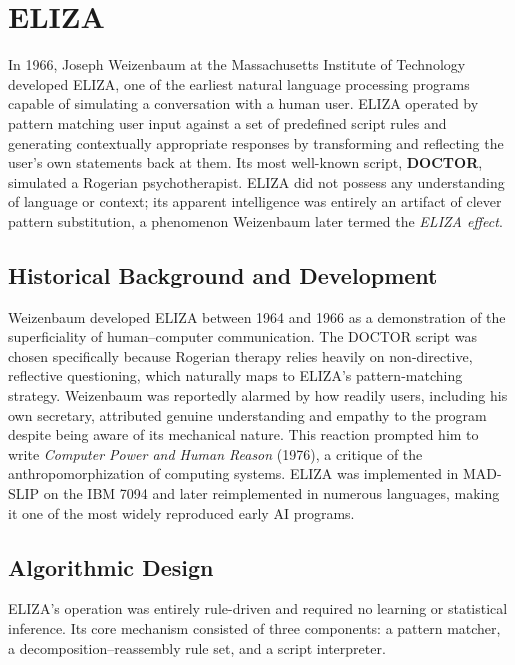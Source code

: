 \documentclass[11pt,a4paper]{report}
\begin{document}

\section{ELIZA}
In 1966, Joseph Weizenbaum at the Massachusetts Institute of Technology developed ELIZA, one of the earliest
natural language processing programs capable of simulating a conversation with a human user. ELIZA operated by
pattern matching user input against a set of predefined script rules and generating contextually appropriate
responses by transforming and reflecting the user's own statements back at them. Its most well-known script,
\textbf{DOCTOR}, simulated a Rogerian psychotherapist. ELIZA did not possess any understanding of language or
context; its apparent intelligence was entirely an artifact of clever pattern substitution, a phenomenon
Weizenbaum later termed the \textit{ELIZA effect}.

\subsection{Historical Background and Development}
Weizenbaum developed ELIZA between 1964 and 1966 as a demonstration of the superficiality of human--computer
communication. The DOCTOR script was chosen specifically because Rogerian therapy relies heavily on non-directive,
reflective questioning, which naturally maps to ELIZA's pattern-matching strategy. Weizenbaum was reportedly alarmed
by how readily users, including his own secretary, attributed genuine understanding and empathy to the program despite
being aware of its mechanical nature. This reaction prompted him to write \textit{Computer Power and Human Reason}
(1976), a critique of the anthropomorphization of computing systems. ELIZA was implemented in MAD-SLIP on the
IBM 7094 and later reimplemented in numerous languages, making it one of the most widely reproduced early AI programs.

\subsection{Algorithmic Design}
ELIZA's operation was entirely rule-driven and required no learning or statistical inference. Its core mechanism
consisted of three components: a pattern matcher, a decomposition--reassembly rule set, and a script interpreter.
\end{document}
